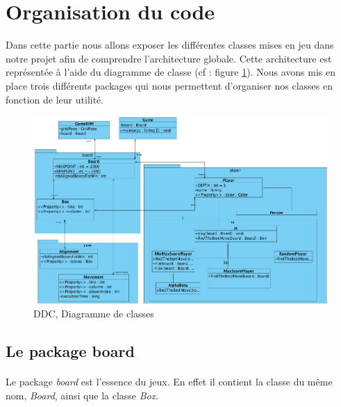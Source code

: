 \documentclass{report}
\begin{document}
		\section{Organisation du code}
            Dans cette partie nous allons exposer les différentes classes mises en jeu dans notre projet afin de comprendre l'architecture globale. Cette architecture est représentée à l'aide du diagramme de classe (cf : figure \ref{DDC}).
            Nous avons mis en place trois différents packages qui nous permettent d'organiser nos classes en fonction de leur utilité.
            \begin{figure}[!t]
            	\centering
                \caption{DDC, Diagramme de classes}
                \label{DDC}
                \includegraphics[scale=0.50]{diagrammeDeClasses.png}
            \end{figure}
			
			\subsection{Le package board}\label{packageBoard}
               		\paragraph{}
                			Le package \textit{board} est l'essence du jeux. En effet il contient la classe du même nom, \textit{Board}, ainsi que la classe \textit{Box}.
\end{document}
